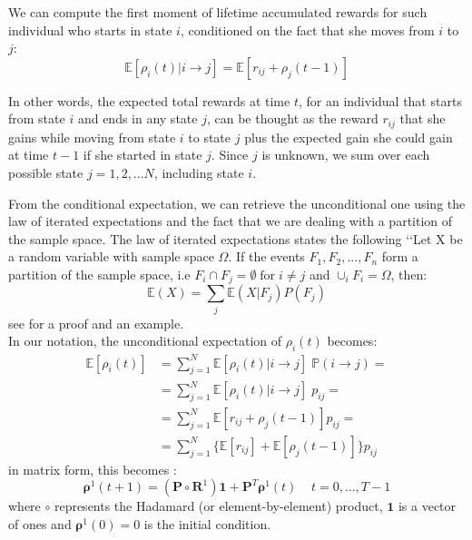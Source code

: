 \documentclass[\main/main.tex]{subfiles}
\begin{document}
We can compute the first moment of lifetime accumulated rewards for such individual who starts in state $i$, conditioned on the fact that she moves from $i$ to $j$:
    \begin{equation}
        \mathds{E}[ \rho_i(t) | i \rightarrow j] = \mathds{E}[ r_{ij} + \rho_j(t-1) ]
    \end{equation}

In other words, the expected total rewards at time $t$, for an individual that starts from state $i$ and ends in any state $j$, can be thought as the reward $r_{ij}$ that she gains while moving from state $i$ to state $j$ plus the expected gain she could gain at time $t-1$ if she started in state $j$. Since $j$ is unknown, we sum over each possible state $j = 1,2, ...N$, including state $i$.
    
    
From the conditional expectation, we can retrieve the unconditional one using the law of iterated expectations and the fact that we are dealing with a partition of the sample space. The law of iterated expectations states the following \lq\lq Let X be a random variable with sample space $\Omega$. If the events $F_1, F_2, ..., F_n$ form a partition of the sample space, i.e $F_i \cap F_j = \emptyset \; \text{for} \; i \neq j$ and $\cup_i F_i = \Omega$, then:
\begin{equation}
\mathds{E} (X) = \sum_j \mathds{E}(X | F_j) P(F_j)
\end{equation}
see \cite{Grinstead1997} for a proof and an example.\\



\noindent In our notation, the unconditional expectation of $ \rho_i(t) $ becomes:
    \begin{equation}\label{unconditional}
    \begin{split}
         \mathds{E}[ \rho_i(t)] &= \sum_{j=1}^N \mathds{E}[\rho_i(t) | i \rightarrow j] \; \mathds{P}( i \rightarrow j) = \\
         &= \sum_{j=1}^N  \mathds{E}[\rho_i(t) | i \rightarrow j]\; p_{ij} =\\
         &= \sum_{j=1}^N    \mathds{E}[ r_{ij} + \rho_j(t-1)]  p_{ij} = \\
         &= \sum_{j=1}^N  \{  \mathds{E}[ r_{ij}] + \mathds{E}[\rho_j(t-1)]\}  p_{ij}
    \end{split}
    \end{equation}
in matrix form, this becomes \citep{Caswell2011}:
\begin{equation}
        \bm{\rho}^1(t+1) = (\mathbf{P} \circ \mathbf{R}^1) \mathbf{1} + \mathbf{P}^T \bm{\rho}^1(t) \;\;\;\; t=0,..., T-1
\end{equation}
where $\circ$ represents the Hadamard (or element-by-element) product, $\mathbf{1}$ is a vector of ones and $\bm{\rho}^1(0) = 0$ is the initial condition.\\
\end{document}
